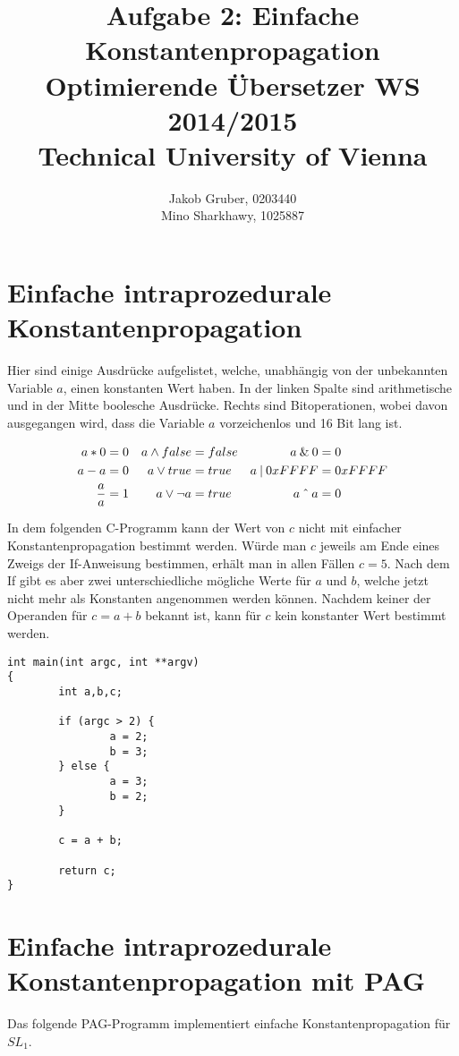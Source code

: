 \documentclass[a4paper,10pt]{article}
\title{Aufgabe 2: Einfache Konstantenpropagation \\
       Optimierende Übersetzer WS 2014/2015 \\
       Technical University of Vienna}
\author{Jakob Gruber, 0203440 \\
        Mino Sharkhawy, 1025887}
\begin{document}
\maketitle

\section{Einfache intraprozedurale Konstantenpropagation}

Hier sind einige Ausdrücke aufgelistet, welche, unabhängig von der unbekannten
Variable $a$, einen konstanten Wert haben. In der linken Spalte sind arithmetische
und in der Mitte boolesche Ausdrücke. Rechts sind Bitoperationen, wobei davon
ausgegangen wird, dass die Variable $a$ vorzeichenlos und 16 Bit lang ist.

\begin{align*}
        a * 0 &= 0 & a \wedge false &= false & a \mathbin{\char`\&} 0 &= 0\\
        a - a &= 0 & a \vee true &= true & a \mathbin{\char`\|} 0xFFFF &= 0xFFFF\\
        \frac{a}{a} &= 1 & a \vee \neg a &= true & a \mathbin{\char`\^} a &= 0\\
\end{align*}

In dem folgenden C-Programm kann der Wert von $c$ nicht mit einfacher
Konstantenpropagation bestimmt werden. Würde man $c$ jeweils am Ende eines Zweigs der
If-Anweisung bestimmen, erhält man in allen Fällen $c = 5$. Nach dem If gibt es aber
zwei unterschiedliche mögliche Werte für $a$ und $b$, welche jetzt nicht mehr als
Konstanten angenommen werden können. Nachdem keiner der Operanden für $c = a + b$
bekannt ist, kann für $c$ kein konstanter Wert bestimmt werden.

\begin{lstlisting}
int main(int argc, int **argv)
{
        int a,b,c;

        if (argc > 2) {
                a = 2;
                b = 3;
        } else {
                a = 3;
                b = 2;
        }

        c = a + b;

        return c;
}
\end{lstlisting}

\section{Einfache intraprozedurale Konstantenpropagation mit PAG}

Das folgende PAG-Programm implementiert einfache Konstantenpropagation für $SL_1$.


\end{document}
